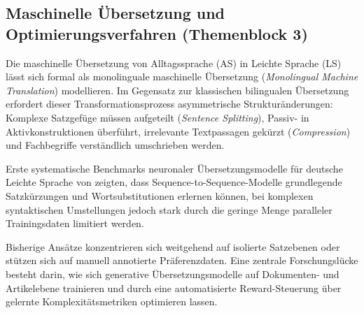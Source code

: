 \subsection{Maschinelle Übersetzung und Optimierungsverfahren (Themenblock 3)}
\label{sec:maschinelle_textvereinfachung_alignment}
\label{sec:maschinelle_uebersetzung_modellierung}
\label{sec:dpo_textgenerierung}

Die maschinelle Übersetzung von Alltagssprache (AS) in Leichte Sprache (LS) lässt sich formal als monolinguale maschinelle Übersetzung (\textit{Monolingual Machine Translation}) modellieren. Im Gegensatz zur klassischen bilingualen Übersetzung erfordert dieser Transformationsprozess asymmetrische Strukturänderungen: Komplexe Satzgefüge müssen aufgeteilt (\textit{Sentence Splitting}), Passiv- in Aktivkonstruktionen überführt, irrelevante Textpassagen gekürzt (\textit{Compression}) und Fachbegriffe verständlich umschrieben werden.

Erste systematische Benchmarks neuronaler Übersetzungsmodelle für deutsche Leichte Sprache von \citet{saeuberli2020benchmarking} zeigten, dass Sequence-to-Sequence-Modelle grundlegende Satzkürzungen und Wortsubstitutionen erlernen können, bei komplexen syntaktischen Umstellungen jedoch stark durch die geringe Menge paralleler Trainingsdaten limitiert werden.

Bisherige Ansätze konzentrieren sich weitgehend auf isolierte Satzebenen oder stützen sich auf manuell annotierte Präferenzdaten. Eine zentrale Forschungslücke besteht darin, wie sich generative Übersetzungsmodelle auf Dokumenten- und Artikelebene trainieren und durch eine automatisierte Reward-Steuerung über gelernte Komplexitätsmetriken optimieren lassen.

